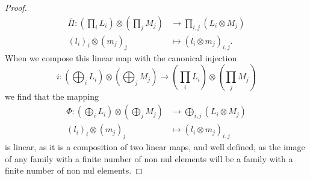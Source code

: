 \documentclass{report}
\theoremstyle{definition}
\theoremstyle{remark}
\begin{document}
\begin{proof}
\begin{equation*}
                        \begin{split}
                                \overline{\Pi} : (\prod_i L_i) \otimes (\prod_j M_j) & \to \prod_{i,j} (L_i \otimes M_j) \\
                                (l_i)_i \otimes (m_j)_j & \mapsto (l_i \otimes m_j)_{i,j}.
                        \end{split}
                \end{equation*}
                When we compose this linear map with the canonical injection
                \begin{equation*}
                        i : (\bigoplus_i L_i) \otimes (\bigoplus_j M_j)  \to (\prod_i L_i) \otimes (\prod_j M_j)
                \end{equation*}
                we find that the mapping
                \begin{equation*}
                        \begin{split}
                                \Phi : (\bigoplus_i L_i ) \otimes (\bigoplus_j M_j) &\to \bigoplus_{i,j} (L_i \otimes M_j) \\
                                (l_i)_i \otimes (m_j)_j & \mapsto (l_i \otimes m_j)_{i,j}
                        \end{split}
                \end{equation*}
                is linear, as it is a composition of two linear maps, and well defined, as the image of any family with a finite number of non nul elements will be a family with a finite number of non nul elements. 


\end{proof}
\end{document}
